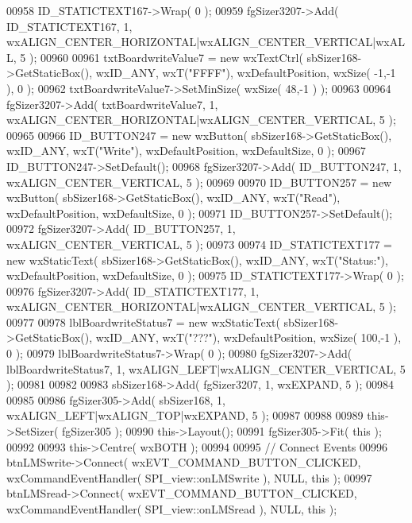 \begin{DoxyCode}
00958     ID_STATICTEXT167->Wrap( 0 );
00959     fgSizer3207->Add( ID_STATICTEXT167, 1, wxALIGN\_CENTER\_HORIZONTAL|wxALIGN\_CENTER\_VERTICAL|wxALL, 5 );
00960     
00961     txtBoardwriteValue7 = \textcolor{keyword}{new} wxTextCtrl( sbSizer168->GetStaticBox(), wxID\_ANY, wxT(\textcolor{stringliteral}{"FFFF"}), 
      wxDefaultPosition, wxSize( -1,-1 ), 0 );
00962     txtBoardwriteValue7->SetMinSize( wxSize( 48,-1 ) );
00963     
00964     fgSizer3207->Add( txtBoardwriteValue7, 1, wxALIGN\_CENTER\_HORIZONTAL|wxALIGN\_CENTER\_VERTICAL, 5 );
00965     
00966     ID_BUTTON247 = \textcolor{keyword}{new} wxButton( sbSizer168->GetStaticBox(), wxID\_ANY, wxT(\textcolor{stringliteral}{"Write"}), wxDefaultPosition, 
      wxDefaultSize, 0 );
00967     ID_BUTTON247->SetDefault(); 
00968     fgSizer3207->Add( ID_BUTTON247, 1, wxALIGN\_CENTER\_VERTICAL, 5 );
00969     
00970     ID_BUTTON257 = \textcolor{keyword}{new} wxButton( sbSizer168->GetStaticBox(), wxID\_ANY, wxT(\textcolor{stringliteral}{"Read"}), wxDefaultPosition, 
      wxDefaultSize, 0 );
00971     ID_BUTTON257->SetDefault(); 
00972     fgSizer3207->Add( ID_BUTTON257, 1, wxALIGN\_CENTER\_VERTICAL, 5 );
00973     
00974     ID_STATICTEXT177 = \textcolor{keyword}{new} wxStaticText( sbSizer168->GetStaticBox(), wxID\_ANY, wxT(\textcolor{stringliteral}{"Status:"}), 
      wxDefaultPosition, wxDefaultSize, 0 );
00975     ID_STATICTEXT177->Wrap( 0 );
00976     fgSizer3207->Add( ID_STATICTEXT177, 1, wxALIGN\_CENTER\_HORIZONTAL|wxALIGN\_CENTER\_VERTICAL, 5 );
00977     
00978     lblBoardwriteStatus7 = \textcolor{keyword}{new} wxStaticText( sbSizer168->GetStaticBox(), wxID\_ANY, wxT(\textcolor{stringliteral}{"???"}), 
      wxDefaultPosition, wxSize( 100,-1 ), 0 );
00979     lblBoardwriteStatus7->Wrap( 0 );
00980     fgSizer3207->Add( lblBoardwriteStatus7, 1, wxALIGN\_LEFT|wxALIGN\_CENTER\_VERTICAL, 5 );
00981     
00982     
00983     sbSizer168->Add( fgSizer3207, 1, wxEXPAND, 5 );
00984     
00985     
00986     fgSizer305->Add( sbSizer168, 1, wxALIGN\_LEFT|wxALIGN\_TOP|wxEXPAND, 5 );
00987     
00988     
00989     this->SetSizer( fgSizer305 );
00990     this->Layout();
00991     fgSizer305->Fit( \textcolor{keyword}{this} );
00992     
00993     this->Centre( wxBOTH );
00994     
00995     \textcolor{comment}{// Connect Events}
00996     btnLMSwrite->Connect( wxEVT\_COMMAND\_BUTTON\_CLICKED, wxCommandEventHandler( 
      SPI_view::onLMSwrite ), NULL, \textcolor{keyword}{this} );
00997     btnLMSread->Connect( wxEVT\_COMMAND\_BUTTON\_CLICKED, wxCommandEventHandler( 
      SPI_view::onLMSread ), NULL, \textcolor{keyword}{this} );

\end{DoxyCode}
